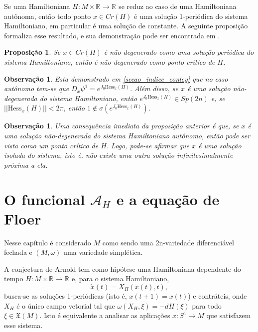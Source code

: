 \documentclass[12pt]{book}
\newtheorem{observacao}[teorema]{Observação}
\newtheorem{proposicao}[teorema]{Proposição}
\newcommand{\campohamiltonianoabrev}{X_{H}}
\newcommand{\campossuaves}[1]{\mathfrak{X}(#1)}
\newcommand{\circulo}{S^{1}}
\newcommand{\espectrooperador}[1]{\sigma(#1)}
\newcommand{\estruturacomplexa}{J_{0}}
\newcommand{\formaSimpletica}[2]{\omega(#1, #2)}
\newcommand{\funcionalH}{\mathcal{A}_{H}}
\newcommand{\gruposimpletico}[1]{Sp(#1)}
\newcommand{\hessianaponto}[2]{\text{Hess}_{#1}(#2)}
\newcommand{\norma}[1]{||#1||}
\newcommand{\pontoscriticos}[1]{\textit{Cr}(#1)}
\newcommand{\real}[1]{\mathbb{R}^{#1}}
\newcommand{\reta}{\real{}}
\begin{document}
	Se uma Hamiltoniana $H:M\times \reta\to \reta$ se reduz ao caso de uma Hamiltoniana autônoma, então todo ponto $x\in \pontoscriticos{H}$ é uma solução 1-periódica do sistema Hamiltoniano, em particular é uma solução de constante. A seguinte proposição formaliza esse resultado, e sua demonstração pode ser encontrada em \cite{audi_floer_homology}.
	
	\begin{proposicao}
		Se $x \in \pontoscriticos{H}$ é não-degenerado como uma solução periódica do sistema Hamiltoniano, então é não-degenerado como ponto crítico de $H$.
	\end{proposicao}
	
	\begin{observacao}
		Esta demonstrado em \ref{secao_indice_conley} que no caso autônomo tem-se que $D_{x}\psi^{1} = e^{\estruturacomplexa \hessianaponto{x}{H}}$. Além disso, se $x$ é uma solução não-degenerada do sistema Hamiltoniano, então $e^{\estruturacomplexa \hessianaponto{x}{H}} \in \gruposimpletico{2n}$ e, se $\norma{\hessianaponto{x}{H}}<2\pi$, então $1\notin \espectrooperador{e^{\estruturacomplexa \hessianaponto{x}{H}}}$.
	\end{observacao}
	
	\begin{observacao}
		Uma consequência imediata da proposição anterior é que, se $x$ é uma solução não-degenerada do sistema Hamiltoniano autônomo, então pode ser vista como um ponto crítico de $H$. Logo, pode-se afirmar que $x$ é uma solução isolada do sistema, isto é, não existe uma outra solução infinitesimalmente próxima a ela.
	\end{observacao}
	
	
	\section{O funcional $\funcionalH$ e a equação de Floer}\label{secao_funcional_hamiltoniano}
	
	Nesse capítulo é considerado $M$ como sendo uma 2n-variedade diferenciável fechada e $(M, \omega)$ uma variedade simplética.
	
	A conjectura de Arnold tem como hipótese uma Hamiltoniana dependente do tempo $H: M\times \reta \to \reta$ e, para o sistema Hamiltoniano,
	$$
	\dot{x}(t) = X_{H}(x(t), t),
	$$
	busca-se as soluções 1-periódicas (isto é, $x(t+1)=x(t)$) e contráteis, onde $\campohamiltonianoabrev$ é o único campo vetorial tal que $\formaSimpletica{\campohamiltonianoabrev}{\xi} = -dH(\xi)$ para todo $\xi \in \campossuaves{M}$. Isto é equivalente a analisar as aplicações $x : \circulo\to M$ que satisfazem esse sistema.
	
\end{document}
